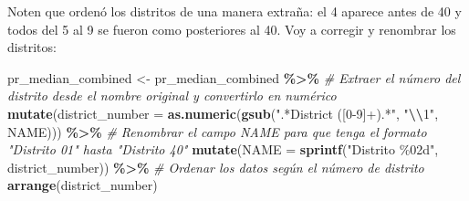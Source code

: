 \documentclass[
]{article}
\newenvironment{Shaded}{\begin{snugshade}}{\end{snugshade}}
\newcommand{\AttributeTok}[1]{\textcolor[rgb]{0.13,0.29,0.53}{#1}}
\newcommand{\CommentTok}[1]{\textcolor[rgb]{0.56,0.35,0.01}{\textit{#1}}}
\newcommand{\FunctionTok}[1]{\textcolor[rgb]{0.13,0.29,0.53}{\textbf{#1}}}
\newcommand{\NormalTok}[1]{#1}
\newcommand{\OtherTok}[1]{\textcolor[rgb]{0.56,0.35,0.01}{#1}}
\newcommand{\SpecialCharTok}[1]{\textcolor[rgb]{0.81,0.36,0.00}{\textbf{#1}}}
\newcommand{\StringTok}[1]{\textcolor[rgb]{0.31,0.60,0.02}{#1}}
\begin{document}
Noten que ordenó los distritos de una manera extraña: el 4 aparece antes
de 40 y todos del 5 al 9 se fueron como posteriores al 40. Voy a
corregir y renombrar los distritos:

\begin{Shaded}
\begin{Highlighting}[]
\NormalTok{pr\_median\_combined }\OtherTok{\textless{}{-}}\NormalTok{ pr\_median\_combined }\SpecialCharTok{\%\textgreater{}\%}
  \CommentTok{\# Extraer el número del distrito desde el nombre original y convertirlo en numérico}
  \FunctionTok{mutate}\NormalTok{(}\AttributeTok{district\_number =} \FunctionTok{as.numeric}\NormalTok{(}\FunctionTok{gsub}\NormalTok{(}\StringTok{".*District ([0{-}9]+).*"}\NormalTok{, }\StringTok{"}\SpecialCharTok{\textbackslash{}\textbackslash{}}\StringTok{1"}\NormalTok{, NAME))) }\SpecialCharTok{\%\textgreater{}\%}
  \CommentTok{\# Renombrar el campo NAME para que tenga el formato "Distrito 01" hasta "Distrito 40"}
  \FunctionTok{mutate}\NormalTok{(}\AttributeTok{NAME =} \FunctionTok{sprintf}\NormalTok{(}\StringTok{"Distrito \%02d"}\NormalTok{, district\_number)) }\SpecialCharTok{\%\textgreater{}\%}
  \CommentTok{\# Ordenar los datos según el número de distrito}
  \FunctionTok{arrange}\NormalTok{(district\_number)}


\end{Highlighting}
\end{Shaded}
\end{document}
